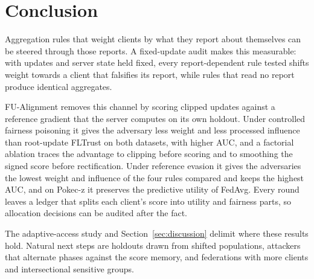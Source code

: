 \section{Conclusion}
\label{sec:conclusion}

Aggregation rules that weight clients by what they report about themselves can be steered through those reports. A fixed-update audit makes this measurable: with updates and server state held fixed, every report-dependent rule tested shifts weight towards a client that falsifies its report, while rules that read no report produce identical aggregates.

FU-Alignment removes this channel by scoring clipped updates against a reference gradient that the server computes on its own holdout. Under controlled fairness poisoning it gives the adversary less weight and less processed influence than root-update FLTrust on both datasets, with higher AUC, and a factorial ablation traces the advantage to clipping before scoring and to smoothing the signed score before rectification. Under reference evasion it gives the adversaries the lowest weight and influence of the four rules compared and keeps the highest AUC, and on Pokec-z it preserves the predictive utility of FedAvg. Every round leaves a ledger that splits each client's score into utility and fairness parts, so allocation decisions can be audited after the fact.

The adaptive-access study and Section~\ref{sec:discussion} delimit where these results hold. Natural next steps are holdouts drawn from shifted populations, attackers that alternate phases against the score memory, and federations with more clients and intersectional sensitive groups.
